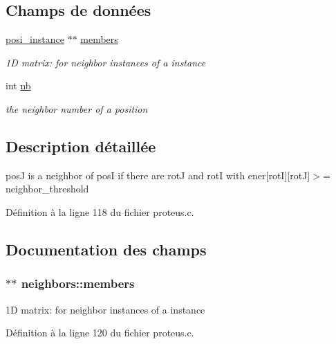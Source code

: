 \subsection*{Champs de données}
\begin{DoxyCompactItemize}
\item 
\hyperlink{read__conf_8h_ae233ac376b010d04519bd914edac5260}{posi\+\_\+instance} $\ast$$\ast$ \hyperlink{structneighbors_a31c948872b5c47622db75b9c8c3cbb49}{members}
\begin{DoxyCompactList}\small\item\em 1\+D matrix\+: for neighbor instances of a instance \end{DoxyCompactList}\item 
int \hyperlink{structneighbors_a0632cb660bbcd34eb0c1f15b4f2265f8}{nb}
\begin{DoxyCompactList}\small\item\em the neighbor number of a position \end{DoxyCompactList}\end{DoxyCompactItemize}


\subsection{Description détaillée}
pos\+J is a neighbor of pos\+I if there are rot\+J and rot\+I with ener\mbox{[}rot\+I\mbox{]}\mbox{[}rot\+J\mbox{]}$>$= neighbor\+\_\+threshold 

Définition à la ligne 118 du fichier proteus.\+c.



\subsection{Documentation des champs}
\hypertarget{structneighbors_a31c948872b5c47622db75b9c8c3cbb49}{
\subsubsection[{members}]{$\ast$$\ast$ neighbors\+::members}}\label{structneighbors_a31c948872b5c47622db75b9c8c3cbb49}


1\+D matrix\+: for neighbor instances of a instance 



Définition à la ligne 120 du fichier proteus.\+c.


